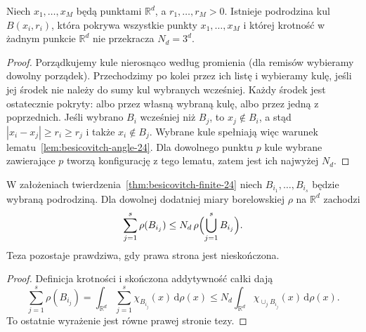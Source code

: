 \begin{twierdzenie}
\label{thm:besicovitch-finite-24}
Niech $x_1,\ldots,x_M$ będą punktami $\mathbb R^d$,
a $r_1,\ldots,r_M>0$. Istnieje podrodzina kul
$B(x_i,r_i)$, która pokrywa wszystkie punkty
$x_1,\ldots,x_M$ i której krotność w żadnym punkcie
$\mathbb R^d$ nie przekracza $N_d=3^d$.
\end{twierdzenie}
\begin{proof}
Porządkujemy kule nierosnąco według promienia (dla remisów
wybieramy dowolny porządek). Przechodzimy po kolei przez
ich listę i wybieramy kulę, jeśli jej środek nie należy
do sumy kul wybranych wcześniej. Każdy środek jest ostatecznie
pokryty: albo przez własną wybraną kulę, albo przez jedną
z poprzednich. Jeśli wybrano $B_i$ wcześniej niż $B_j$,
to $x_j\notin B_i$, a stąd $|x_i-x_j|\ge r_i\ge r_j$
i także $x_i\notin B_j$. Wybrane kule spełniają więc
warunek lematu~\ref{lem:besicovitch-angle-24}.
Dla dowolnego punktu $p$ kule wybrane zawierające $p$
tworzą konfigurację z tego lematu, zatem jest ich najwyżej
$N_d$.
\end{proof}

\begin{wniosek}
\label{cor:finite-besicovitch-measure-24}
W założeniach twierdzenia~\ref{thm:besicovitch-finite-24}
niech $B_{i_1},\ldots,B_{i_s}$ będzie wybraną podrodziną.
Dla dowolnej dodatniej miary borelowskiej $\rho$
na $\mathbb R^d$ zachodzi
\[
 \sum_{j=1}^s\rho(B_{i_j})
 \le N_d\,\rho\Bigl(\bigcup_{j=1}^s B_{i_j}\Bigr).
\]
Teza pozostaje prawdziwa, gdy prawa strona jest nieskończona.
\end{wniosek}
\begin{proof}
Definicja krotności i skończona addytywność całki dają
\[
 \sum_{j=1}^s\rho(B_{i_j})
 =\int_{\mathbb R^d}\sum_{j=1}^s\chi_{B_{i_j}}(x)
 \,\mathrm d\rho(x)
 \le N_d\int_{\mathbb R^d}
 \chi_{\cup_jB_{i_j}}(x)\,\mathrm d\rho(x).
\]
To ostatnie wyrażenie jest równe prawej stronie tezy.
\end{proof}

